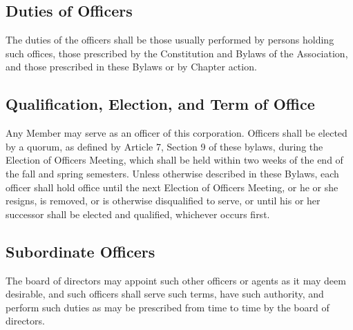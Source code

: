 \documentclass{article}
\begin{document}
	\subsection{Duties of Officers}
	The duties of the officers shall be those usually performed by persons holding such offices, those prescribed by the Constitution and Bylaws of the Association, and those prescribed in these Bylaws or by Chapter action.
	\subsection{Qualification, Election, and Term of Office}
	Any Member may serve as an officer of this corporation. Officers shall be elected by a quorum, as defined by Article 7, Section 9 of these bylaws, during the Election of Officers Meeting, which shall be held within two weeks of the end of the fall and spring semesters. Unless otherwise described in these Bylaws, each officer shall hold office until the next Election of Officers Meeting, or he or she resigns, is removed, or is otherwise disqualified to serve, or until his or her successor shall be elected and qualified, whichever occurs first.
	\subsection{Subordinate Officers}
	The board of directors may appoint such other officers or agents as it may deem desirable, and such officers shall serve such terms, have such authority, and perform such duties as may be prescribed from time to time by the board of directors.
\end{document}
